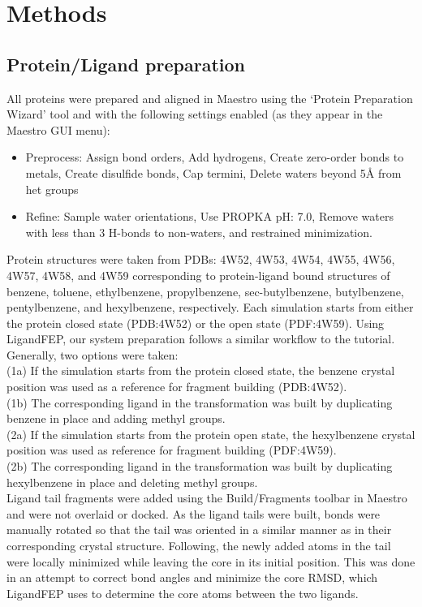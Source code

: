 \section{Methods}
\subsection{Protein/Ligand preparation}
All proteins were prepared and aligned in Maestro\cite{Maestro} using the `Protein Preparation Wizard'\cite{ProteinPrepWizSoftware,Epik,Impact,Prime,ProteinPrepWizPaper} tool and with the following settings enabled (as they appear in the Maestro GUI menu):
   \begin{itemize}
   \item Preprocess: Assign bond orders, Add hydrogens, Create zero-order bonds to metals, Create disulfide bonds, Cap termini, Delete waters beyond 5\AA{} from het groups
   \item Refine: Sample water orientations, Use PROPKA pH: 7.0, Remove waters with less than 3 H-bonds to non-waters, and restrained minimization.
   \end{itemize}

Protein structures were taken from PDBs: 4W52, 4W53, 4W54, 4W55, 4W56, 4W57, 4W58, and 4W59 corresponding to protein-ligand bound structures of benzene, toluene, ethylbenzene, propylbenzene, sec-butylbenzene, butylbenzene, pentylbenzene, and hexylbenzene, respectively\cite{Merski2015}.
Each simulation starts from either the protein closed state (PDB:4W52) or the open state (PDF:4W59).
Using LigandFEP, our system preparation follows a similar workflow to the tutorial\cite{LigandFEP}.
Generally, two options were taken:\\
(1a) If the simulation starts from the protein closed state, the benzene crystal position was used as a reference for fragment building (PDB:4W52).\\
(1b) The corresponding ligand in the transformation was built by duplicating benzene in place and adding methyl groups.\\
(2a) If the simulation starts from the protein open state, the hexylbenzene crystal position was used as reference for fragment building (PDF:4W59).\\
(2b) The corresponding ligand in the transformation was built by duplicating hexylbenzene in place and deleting methyl groups.\\
Ligand tail fragments were added using the Build/Fragments toolbar in Maestro  and were not overlaid or docked.
As the ligand tails were built, bonds were manually rotated so that the tail was oriented in a similar manner as in their corresponding crystal structure.
Following, the newly added atoms in the tail were locally minimized while leaving the core in its initial position.
This was done in an attempt to correct bond angles and minimize the core RMSD, which LigandFEP uses to determine the core atoms between the two ligands.

